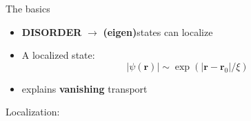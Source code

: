 \documentclass[1pt]{beamer}
\begin{document}

\begin{frame}{The basics}
\begin{minipage}[c]{0.5\textwidth}
\begin{itemize}
\item \textbf{DISORDER} $\rightarrow$ \textbf{(eigen)}states can localize
\vspace{10mm}
\item A localized state:
$$|\psi(\mathbf{r})| \sim \exp\left(|\mathbf{r} - \mathbf{r}_0 |/\xi \right)$$
\vspace{5mm}
\item explains \textbf{vanishing} transport
\vspace{10mm}
\end{itemize}
\end{minipage}
\begin{minipage}[c]{0.4\textwidth}
\centering
Localization:
\begin{figure}
\end{figure}
\end{minipage}
\end{frame}
\end{document}
